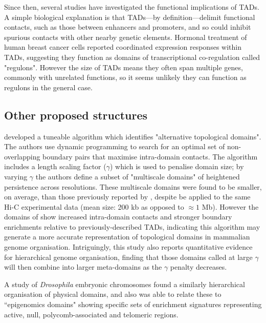 \documentclass[a4paper,11pt,oneside]{book}
\begin{document}
Since then, several studies have investigated the functional implications of TADs. A simple biological explanation is that TADs---by definition---delimit functional contacts, such as those between enhancers and promoters, and so could inhibit spurious contacts with other nearby genetic elements.\cite{Fraser2015, Sexton2015} Hormonal treatment of human breast cancer cells reported coordinated expression responses within TADs, suggesting they function as domains of transcriptional co-regulation called "regulons".\cite{LeDily2014} However the size of TADs means they often span multiple genes, commonly with unrelated functions, so it seems unlikely they can function as regulons in the general case.\cite{Pombo2015}

\subsection{Other proposed structures}

\citet{Filippova2014} developed a tuneable algorithm which identifies "alternative topological domains". The authors use dynamic programming to search for an optimal set of non-overlapping boundary pairs that maximise intra-domain contacts. The algorithm includes a length scaling factor ($\gamma$) which is used to penalise domain size; by varying $\gamma$ the authors define a subset of "multiscale domains" of heightened persistence across resolutions.\cite{Filippova2014} These multiscale domains were found to be smaller, on average, than those previously reported by \citet{Dixon2012}, despite be applied to the same Hi-C experimental data (mean size: 200 kb as opposed to $\approx 1$ Mb). However the domains of \citet{Filippova2014} show increased intra-domain contacts and stronger boundary enrichments relative to previously-described TADs, indicating this algorithm may generate a more accurate representation of topological domains in mammalian genome organisation. Intriguingly, this study also reports quantitative evidence for hierarchical genome organisation, finding that those domains called at large $\gamma$ will then combine into larger meta-domains as the $\gamma$ penalty decreases.

A study of \emph{Drosophila} embryonic chromosomes found a similarly hierarchical organisation of physical domains, and also was able to relate these to ``epigenomics domains" showing specific sets of enrichment signatures representing active, null, polycomb-associated and telomeric regions.\cite{Sexton2012} 
\end{document}
